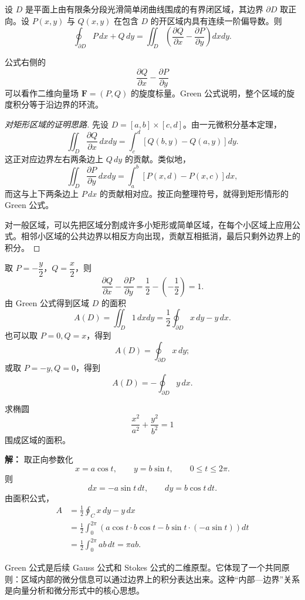 \begin{theorem}[Green 公式]
设 $D$ 是平面上由有限条分段光滑简单闭曲线围成的有界闭区域，其边界 $\partial D$ 取正向。设 $P(x,y)$ 与 $Q(x,y)$ 在包含 $D$ 的开区域内具有连续一阶偏导数。则
\[
    \oint_{\partial D}P\,dx+Q\,dy
    =\iint_D\left(\frac{\partial Q}{\partial x}
    -\frac{\partial P}{\partial y}\right)dxdy.
\]
\end{theorem}

\begin{remark}
公式右侧的
\[
    \frac{\partial Q}{\partial x}-\frac{\partial P}{\partial y}
\]
可以看作二维向量场 $\mathbf{F}=(P,Q)$ 的旋度标量。Green 公式说明，整个区域的旋度积分等于沿边界的环流。
\end{remark}

\begin{proof}[对矩形区域的证明思路]
先设 $D=[a,b]\times[c,d]$。由一元微积分基本定理，
\[
    \iint_D\frac{\partial Q}{\partial x}\,dxdy
    =\int_c^d\left[Q(b,y)-Q(a,y)\right]dy.
\]
这正对应边界左右两条边上 $Q\,dy$ 的贡献。类似地，
\[
    \iint_D\frac{\partial P}{\partial y}\,dxdy
    =\int_a^b\left[P(x,d)-P(x,c)\right]dx,
\]
而这与上下两条边上 $P\,dx$ 的贡献相对应。按正向整理符号，就得到矩形情形的 Green 公式。

对一般区域，可以先把区域分割成许多小矩形或简单区域，在每个小区域上应用公式。相邻小区域的公共边界以相反方向出现，贡献互相抵消，最后只剩外边界上的积分。
\end{proof}

\begin{corollary}[面积公式]
取 $P=-\dfrac{y}{2}$，$Q=\dfrac{x}{2}$，则
\[
    \frac{\partial Q}{\partial x}-\frac{\partial P}{\partial y}
    =\frac12-\left(-\frac12\right)=1.
\]
由 Green 公式得到区域 $D$ 的面积
\[
    A(D)=\iint_D1\,dxdy
    =\frac12\oint_{\partial D}x\,dy-y\,dx.
\]
也可以取 $P=0,Q=x$，得到
\[
    A(D)=\oint_{\partial D}x\,dy;
\]
或取 $P=-y,Q=0$，得到
\[
    A(D)=-\oint_{\partial D}y\,dx.
\]
\end{corollary}

\begin{example}
求椭圆
\[
    \frac{x^2}{a^2}+\frac{y^2}{b^2}=1
\]
围成区域的面积。

\textbf{解：} 取正向参数化
\[
    x=a\cos t,
    \qquad
    y=b\sin t,
    \qquad 0\leq t\leq2\pi.
\]
则
\[
    dx=-a\sin t\,dt,
    \qquad
    dy=b\cos t\,dt.
\]
由面积公式，
\[
\begin{aligned}
    A&=\frac12\oint_C x\,dy-y\,dx \\
    &=\frac12\int_0^{2\pi}
    \left(a\cos t\cdot b\cos t-b\sin t\cdot(-a\sin t)\right)dt \\
    &=\frac12\int_0^{2\pi}ab\,dt
    =\pi ab.
\end{aligned}
\]
\end{example}

\begin{remark}
Green 公式是后续 Gauss 公式和 Stokes 公式的二维原型。它体现了一个共同原则：区域内部的微分信息可以通过边界上的积分表达出来。这种“内部—边界”关系是向量分析和微分形式中的核心思想。
\end{remark}
